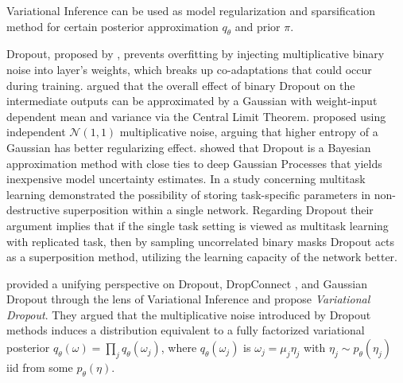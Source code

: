 \documentclass{article}
\begin{document}
Variational Inference can be used as model regularization and sparsification method
for certain posterior approximation $q_\theta$ and prior $\pi$.

Dropout, proposed by \citet{hinton_improving_2012}, prevents overfitting by injecting
multiplicative binary noise into layer's weights, which breaks up co-adaptations that
could occur during training. \citet{wang_fast_2013} argued that the overall effect of
binary Dropout on the intermediate outputs can be approximated by a Gaussian with weight-input
dependent mean and variance via the Central Limit Theorem. \citet{srivastava_dropout_2014}
proposed using independent $\mathcal{N}(1, 1)$ multiplicative noise, arguing that higher
entropy of a Gaussian has better regularizing effect. \citet{gal_dropout_2016} showed
that Dropout is a Bayesian approximation method with close ties to deep Gaussian Processes
that yields inexpensive model uncertainty estimates. In a study concerning multitask learning
\citet{cheung_superposition_2019} demonstrated the possibility of storing task-specific
parameters in non-destructive superposition within a single network. Regarding Dropout
their argument implies that if the single task setting is viewed as multitask learning
with replicated task, then by sampling uncorrelated binary masks Dropout acts as a
superposition method, utilizing the learning capacity of the network better.

%
\citet{kingma_variational_2015} provided a unifying perspective on Dropout, DropConnect
\citep{wan_regularization_2013}, and Gaussian Dropout \citep{wang_fast_2013} through
the lens of Variational Inference and propose \emph{Variational Dropout}. They argued
that the multiplicative noise introduced by Dropout methods induces a distribution
equivalent to a fully factorized variational posterior $
  q_\theta(\omega) = \prod_j q_{\theta}(\omega_j)
$, where $q_{\theta}(\omega_j)$ is $\omega_j = \mu_j \eta_j$ with $
  \eta_j \sim p_\theta(\eta_j)
$ iid from some $p_\theta(\eta)$.
%
\end{document}
